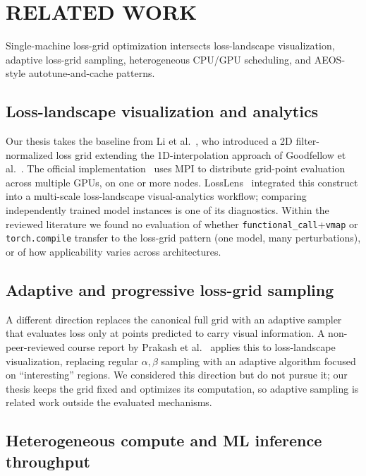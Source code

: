 \section{RELATED WORK}\label{related-work}

Single-machine loss-grid optimization intersects loss-landscape
visualization, adaptive loss-grid sampling, heterogeneous
CPU/GPU scheduling, and AEOS-style autotune-and-cache patterns.

\subsection{Loss-landscape visualization and
analytics}\label{rw-losslandscape}

Our thesis takes the baseline from Li et
al.~\cite{li2018losslandscape}, who introduced a 2D
filter-normalized loss grid extending the 1D-interpolation
approach of Goodfellow et al.~\cite{goodfellow2015qualitative}.
The official implementation~\cite{goldstein_loss_landscape_repo}
uses MPI to distribute grid-point evaluation across multiple GPUs, on one or more nodes.
LossLens~\cite{xie2025losslens,losslens_repo} integrated this
construct into a multi-scale loss-landscape visual-analytics
workflow; comparing independently trained model instances is
one of its diagnostics. Within the reviewed literature we
found no evaluation of whether
\texttt{functional\_call}+\texttt{vmap} or
\texttt{torch.compile} transfer to the loss-grid pattern
(one model, many perturbations), or of how applicability
varies across architectures.

\subsection{Adaptive and progressive loss-grid
sampling}\label{rw-adaptive-sampling}

A different direction replaces the canonical full grid with
an adaptive sampler that evaluates loss only at points
predicted to carry visual information. A non-peer-reviewed
course report by Prakash et al.~\cite{prakash2024adaptive}
applies this to loss-landscape visualization, replacing
regular $\alpha,\beta$ sampling with an adaptive algorithm
focused on ``interesting'' regions. We considered this
direction but do not pursue it; our thesis keeps the grid
fixed and optimizes its computation, so adaptive sampling is
related work outside the evaluated mechanisms.

\subsection{Heterogeneous compute and ML inference
throughput}\label{rw-scheduling}

